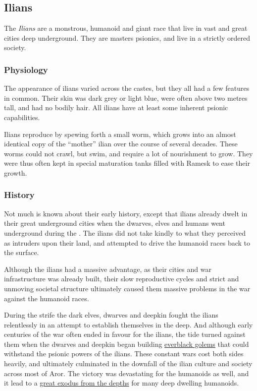 \subsection{Ilians}
\label{sec:Ilians}

The \emph{Ilians} are a monstrous, humanoid and giant race that live in vast
and great cities deep underground. They are masters psionics, and live in a
strictly ordered society.

\subsubsection{Physiology}

The appearance of ilians varied across the castes, but they all had a few
features in common. Their skin was dark grey or light blue, were often above
two metres tall, and had no bodily hair. All ilians have at least some
inherent psionic capabilities.

Ilians reproduce by spewing forth a small worm, which grows into an almost
identical copy of the ``mother'' ilian over the course of several decades.
These worms could not crawl, but swim, and require a lot of nourishment to
grow. They were thus often kept in special maturation tanks filled with Ramesk
to ease their growth.

\subsubsection{History}

Not much is known about their early history, except that ilians already dwelt
in their great underground cities when the dwarves, elves and humans went
underground during the . The ilians did not take kindly to
what they perceived as intruders upon their land, and attempted to drive the
humanoid races back to the surface.

Although the ilians had a massive advantage, as their cities and war
infrastructure was already built, their slow reproductive cycles and strict
and unmoving societal structure ultimately caused them massive problems in
the war against the humanoid races.

During the strife the dark elves, dwarves and deepkin fought the ilians
relentlessly in an attempt to establish themselves in the deep. And although
early centuries of the war often ended in favour for the ilians, the tide
turned against them when the dwarves and deepkin began building
\hyperref[sec:Everblack Golem]{everblack golems} that could withstand the
psionic powers of the ilians. These constant wars cost both sides heavily,
and ultimately culminated in the downfall of the ilian culture and
society across most of Aror. The victory was devastating for the humanoids
as well, and it lead to a
\hyperref[sec:Exodus from the Depths]{great exodus from the depths} for many
deep dwelling humanoids.

